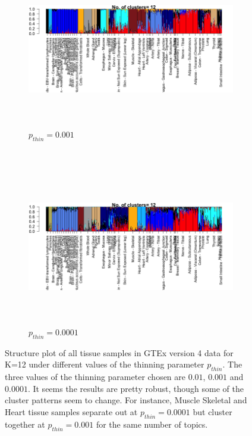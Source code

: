  \begin{figure}[ht]
    \raggedright
     \begin{subfigure}[t]{0.25\textwidth}
        \raggedleft
        \includegraphics[height=2.7in]{../plots/gtex_thinned_clus_12_version_1.png}
        \caption{$p_{thin}=0.001$}
    \end{subfigure}    \\
    \begin{subfigure}[t]{0.25\textwidth}
        \raggedleft
        \includegraphics[height=2.7in]{../plots/gtex_thinned_clus_12_version_2.png}
        \caption{$p_{thin}=0.0001$}
    \end{subfigure}   
    \caption{Structure plot of all tissue samples in GTEx version 4 data for K=12 under different values of the thinning parameter $p_{thin}$. The three values of the thinning parameter chosen are $0.01$, $0.001$ and $0.0001$. It seems the results are pretty robust, though some of the cluster patterns seem to change. For instance, Muscle Skeletal and Heart tissue samples separate out at $p_{thin}=0.0001$ but cluster together at $p_{thin}=0.001$ for the same number of topics.}
    \end{figure}
    
